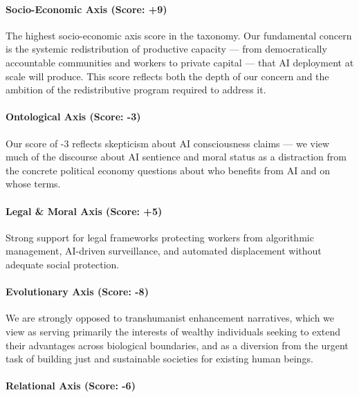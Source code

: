 \paragraph{Socio-Economic Axis (Score:
+9)}\label{socio-economic-axis-score-9}

The highest socio-economic axis score in the taxonomy. Our fundamental
concern is the systemic redistribution of productive capacity --- from
democratically accountable communities and workers to private capital
--- that AI deployment at scale will produce. This score reflects both
the depth of our concern and the ambition of the redistributive program
required to address it.

\paragraph{Ontological Axis (Score:
-3)}\label{ontological-axis-score--3}

Our score of -3 reflects skepticism about AI consciousness claims --- we
view much of the discourse about AI sentience and moral status as a
distraction from the concrete political economy questions about who
benefits from AI and on whose terms.

\paragraph{Legal \& Moral Axis (Score:
+5)}\label{legal-moral-axis-score-5-2}

Strong support for legal frameworks protecting workers from algorithmic
management, AI-driven surveillance, and automated displacement without
adequate social protection.

\paragraph{Evolutionary Axis (Score:
-8)}\label{evolutionary-axis-score--8}

We are strongly opposed to transhumanist enhancement narratives, which
we view as serving primarily the interests of wealthy individuals
seeking to extend their advantages across biological boundaries, and as
a diversion from the urgent task of building just and sustainable
societies for existing human beings.

\paragraph{Relational Axis (Score: -6)}\label{relational-axis-score--6}

